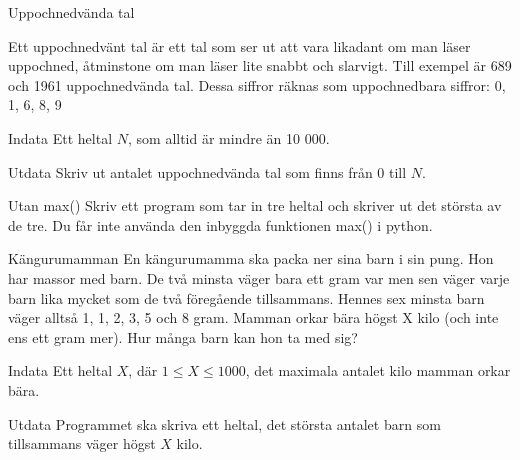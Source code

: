 \documentclass[10pt]{beamer}
\begin{document}
\begin{frame}{Uppochnedvända tal}

Ett uppochnedvänt tal är ett tal som ser ut att vara likadant om man läser uppochned, åtminstone om man läser lite snabbt och slarvigt. Till exempel är 689 och 1961 uppochnedvända tal. Dessa siffror räknas som uppochnedbara siffror: 0, 1, 6, 8, 9 

\begin{exampleblock}{Indata}
Ett heltal $N$, som alltid är mindre än 10 000.
\end{exampleblock}

\begin{exampleblock}{Utdata}
Skriv ut antalet uppochnedvända tal som finns från 0 till $N$.
\end{exampleblock}

\end{frame}





\begin{frame}{Utan max()}
Skriv ett program som tar in tre heltal och skriver ut det största av de tre. Du får inte använda den inbyggda funktionen max() i python. 
\end{frame}




\begin{frame}{Kängurumamman}
 En kängurumamma ska packa ner sina barn i sin pung. Hon har massor med barn. De två minsta väger bara ett gram var men sen väger varje barn lika mycket som de två föregående tillsammans. Hennes sex minsta barn väger alltså 1, 1, 2, 3, 5 och 8 gram. Mamman orkar bära högst X kilo (och inte ens ett gram mer). Hur många barn kan hon ta med sig?

\begin{exampleblock}{Indata}
Ett heltal $X$, där $1{\le}X\le1000$, det maximala antalet kilo mamman orkar bära. 
\end{exampleblock}
\begin{exampleblock}{Utdata}
Programmet ska skriva ett heltal, det största antalet barn som tillsammans väger högst $X$ kilo. 
\end{exampleblock}

\end{frame}
\end{document}

